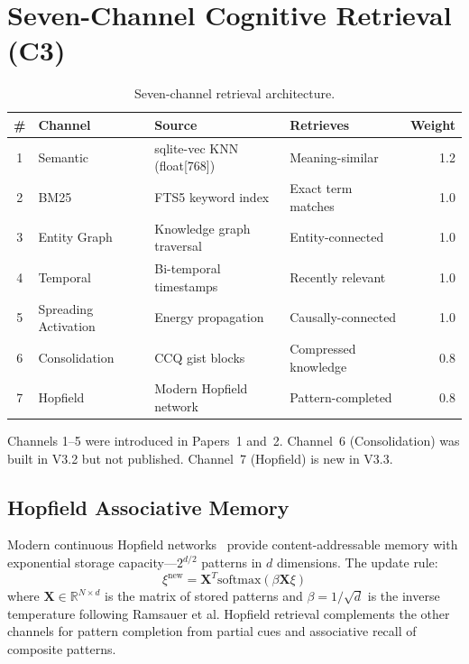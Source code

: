 \section{Seven-Channel Cognitive Retrieval (C3)}
\label{sec:retrieval}

\begin{table}[h]
\centering
\caption{Seven-channel retrieval architecture.}
\label{tab:channels}
\small
\begin{tabular}{clllr}
\toprule
\textbf{\#} & \textbf{Channel} & \textbf{Source} & \textbf{Retrieves} & \textbf{Weight} \\
\midrule
1 & Semantic & sqlite-vec KNN (float[768]) & Meaning-similar & 1.2 \\
2 & BM25 & FTS5 keyword index & Exact term matches & 1.0 \\
3 & Entity Graph & Knowledge graph traversal & Entity-connected & 1.0 \\
4 & Temporal & Bi-temporal timestamps & Recently relevant & 1.0 \\
5 & Spreading Activation & Energy propagation & Causally-connected & 1.0 \\
6 & Consolidation & CCQ gist blocks & Compressed knowledge & 0.8 \\
7 & Hopfield & Modern Hopfield network & Pattern-completed & 0.8 \\
\bottomrule
\end{tabular}
\end{table}

Channels 1--5 were introduced in Papers~1 and~2. Channel~6 (Consolidation) was built in V3.2 but not published. Channel~7 (Hopfield) is new in V3.3.

\subsection{Hopfield Associative Memory}

Modern continuous Hopfield networks~\cite{hopfield-modern} provide content-addressable memory with exponential storage capacity---$2^{d/2}$ patterns in $d$ dimensions. The update rule:
\begin{equation}
\xi^{\text{new}} = \mathbf{X}^T \text{softmax}(\beta \mathbf{X} \xi)
\end{equation}
where $\mathbf{X} \in \mathbb{R}^{N \times d}$ is the matrix of stored patterns and $\beta = 1/\sqrt{d}$ is the inverse temperature following Ramsauer et al. Hopfield retrieval complements the other channels for pattern completion from partial cues and associative recall of composite patterns.

